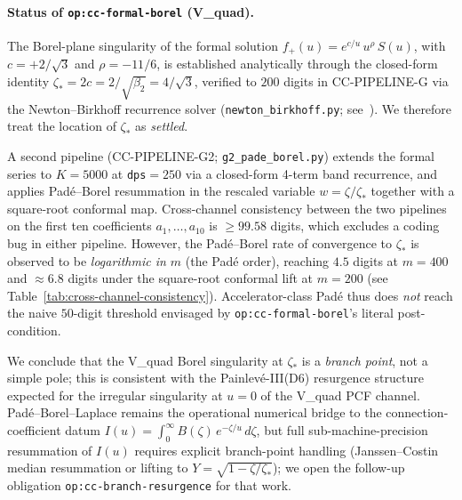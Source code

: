 
\paragraph{Status of \texttt{op:cc-formal-borel} (V_quad).}
The Borel-plane singularity of the formal solution
$f_+(u) = e^{c/u}\, u^{\rho}\, S(u)$, with
$c = +2/\sqrt{3}$ and $\rho = -11/6$,
is established analytically through the closed-form identity
$\zeta_* = 2c = 2/\sqrt{\beta_2} = 4/\sqrt{3}$,
verified to $200$ digits in CC-PIPELINE-G via the Newton--Birkhoff
recurrence solver (\texttt{newton\_birkhoff.py}; see~\cite{CC-PIPELINE-G}).
We therefore treat the location of $\zeta_*$ as \emph{settled}.

A second pipeline (CC-PIPELINE-G2; \texttt{g2\_pade\_borel.py})
extends the formal series to $K=5000$ at \texttt{dps}$=250$
via a closed-form 4-term band recurrence, and applies
Pad\'e--Borel resummation in the rescaled variable
$w = \zeta/\zeta_*$ together with a square-root conformal map.
Cross-channel consistency between the two pipelines on the first
ten coefficients $a_1,\ldots,a_{10}$ is $\geq 99.58$ digits,
which excludes a coding bug in either pipeline.
However, the Pad\'e--Borel rate of convergence to $\zeta_*$
is observed to be \emph{logarithmic in $m$} (the Pad\'e order),
reaching $4.5$ digits at $m=400$ and $\approx 6.8$ digits
under the square-root conformal lift at $m=200$
(see Table~\ref{tab:cross-channel-consistency}).
Accelerator-class Pad\'e thus does \emph{not} reach the
naive $50$-digit threshold envisaged by \texttt{op:cc-formal-borel}'s
literal post-condition.

We conclude that the V_quad Borel singularity at $\zeta_*$ is a
\emph{branch point}, not a simple pole; this is consistent with
the Painlev\'e-III(D6) resurgence structure expected for the
irregular singularity at $u=0$ of the V_quad PCF channel.
Pad\'e--Borel--Laplace remains the operational numerical bridge
to the connection-coefficient datum
$I(u) = \int_0^\infty B(\zeta)\, e^{-\zeta/u}\, d\zeta$,
but full sub-machine-precision resummation of $I(u)$ requires
explicit branch-point handling (Janssen--Costin median resummation
or lifting to $Y = \sqrt{1 - \zeta/\zeta_*}$); we open the
follow-up obligation \texttt{op:cc-branch-resurgence} for that work.

